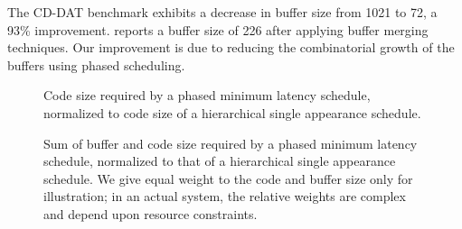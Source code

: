 The CD-DAT benchmark exhibits a decrease in buffer size from 1021 to
72, a 93\% improvement. \cite{murt2000x2} reports a buffer size of 226
after applying buffer merging techniques. Our improvement is due to
reducing the combinatorial growth of the buffers using phased
scheduling.

\begin{figure}[t]
\vspace{6pt}
\caption{\small Code size required by a phased minimum latency schedule,
normalized to code size of a hierarchical single appearance
schedule.\protect\label{fig:codegraph}}
\end{figure}

\begin{figure}[t]
\caption{\small Sum of buffer and code size required by a phased
minimum latency schedule, normalized to that of a hierarchical single
appearance schedule.  We give equal weight to the code and buffer size
only for illustration; in an actual system, the relative weights are
complex and depend upon resource
constraints. \protect\label{fig:sumgraph}}
\vspace{-4pt}
\end{figure}

